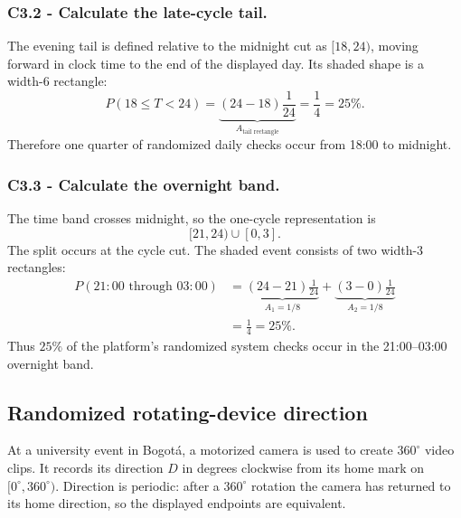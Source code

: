 	\subsubsection*{C3.2 - Calculate the late-cycle tail.}
	\label{subsec:c3-uniform-check-b}
	The evening tail is defined relative to the midnight cut as
	$[18,24)$, moving forward in clock time to the end of the displayed day.  Its
	shaded shape is a width-$6$ rectangle:
	\[
	P(18\le T<24)
	=\underbrace{(24-18)\frac1{24}}_{A_{\text{tail rectangle}}}
	=\frac14=25\%.
	\]
	Therefore one quarter of randomized daily checks occur from 18:00 to
	midnight.
	\begingroup
	\endgroup
	
	\subsubsection*{C3.3 - Calculate the overnight band.}
	\label{subsec:c3-uniform-check-c}
	The time band crosses midnight, so the one-cycle representation is
	\[
	[21,24)\cup[0,3].
	\]
	The split occurs at the cycle cut.  The shaded event consists of two
	width-$3$ rectangles:
	\[
	\begin{aligned}
		P(21{:}00\text{ through }03{:}00)
		&=\underbrace{(24-21)\frac1{24}}_{A_1=1/8}
		+\underbrace{(3-0)\frac1{24}}_{A_2=1/8}\\
		&=\frac14=25\%.
	\end{aligned}
	\]
	Thus $25\%$ of the platform's randomized system checks occur in the
	21:00--03:00 overnight band.
	\begingroup
	\endgroup
	
	\subsection{Randomized rotating-device direction}\label{sec:c3-uniform-device}
	At a university event in Bogot\'a, a motorized camera is used to create
	$360^\circ$ video clips.  It records its direction $D$ in degrees clockwise from
	its home mark on $[0^\circ,360^\circ)$.  Direction is periodic: after a
	$360^\circ$ rotation the camera has returned to its home direction, so the
	displayed endpoints are equivalent.
	

